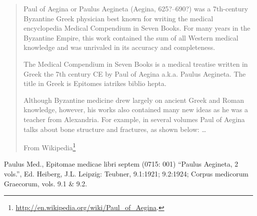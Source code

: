 \documentclass[12pt,letterpaper,twoside,final]{memoir}
\begin{document}
\blockquote[From Wikipedia\footnote{\url{http://en.wikipedia.org/wiki/Paul_of_Aegina}.}]{Paul of Aegina or Paulus Aegineta (Aegina, 625?–690?) was a 7th-century Byzantine Greek physician best known for writing the medical encyclopedia Medical Compendium in Seven Books. For many years in the Byzantine Empire, this work contained the sum of all Western medical knowledge and was unrivaled in its accuracy and completeness.



The Medical Compendium in Seven Books is a medical treatise written in Greek the 7th century CE by Paul of Aegina a.k.a. Paulus Aegineta. The title in Greek is Epitomes iatrikes biblio hepta.

     

Although Byzantine medicine drew largely on ancient Greek and Roman knowledge, however, his works also contained many new ideas as he was a teacher from Alexandria. For example, in several volumes Paul of Aegina talks about bone structure and fractures, as shown below: \ldots}


Paulus Med., Epitomae medicae libri septem (0715: 001)
“Paulus Aegineta, 2 vols.”, Ed. Heiberg, J.L.
Leipzig: Teubner, 9.1:1921; 9.2:1924; Corpus medicorum Graecorum, vols. 9.1 \& 9.2.
\end{document}
